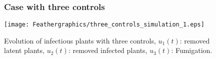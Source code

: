 \documentclass[10pt]{beamer}
\begin{document}
\begin{frame}
\begin{figure}
\frametitle{Case with three controls}
	\centering	
	\texttt{[image: Feathergraphics/three\_controls\_simulation\_1.eps]}
	\caption{Evolution of infectious plants with three controls, $u_1(t)$: removed latent plants, $u_2(t)$: removed infected plants, $u_3(t)$: Fumigation.}
\end{figure}	
\end{frame}



     

\end{document}
